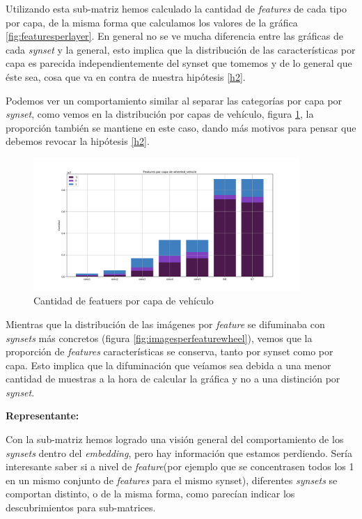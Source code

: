 \documentclass[12,twoside]{TFG-GM}
\theoremstyle{definition}
\theoremstyle{remark}
\begin{document}
Utilizando esta sub-matriz hemos calculado la cantidad de \textit{features} de cada tipo por capa, de la misma forma que calculamos los valores de la gráfica \ref{fig:featuresperlayer}. En general no se ve mucha diferencia entre las gráficas de cada \textit{synset} y la general, esto implica que la distribución de las características por capa es parecida independientemente del synset que tomemos y de lo general que éste sea, cosa que va en contra de nuestra hipótesis \ref{h2}.

Podemos ver un comportamiento similar al separar las categorías por capa por \textit{synset}, como vemos en la distribución por capas de vehículo, figura \ref{fig:featuresperlayervehicle}, 
la proporción también se mantiene en este caso, dando más motivos para pensar que debemos revocar la hipótesis \ref{h2}. 

\begin{figure}[ht] 
	\centering
	\includegraphics[width=0.9\textwidth] {Images/plots/25/synsetslayer/Comparative_of_synsets_wheeled_vehicle_global.png}
	\caption{ Cantidad de featuers por capa de vehículo
	\label{fig:featuresperlayervehicle}}
\end{figure}

Mientras que la distribución de las imágenes por \textit{feature} se difuminaba con \textit{synsets} más concretos (figura \ref{fig:imagesperfeaturewheel}), vemos que la proporción de \textit{features} características se conserva, tanto por synset como por capa. Esto implica que la difuminación que veíamos sea debida a una menor cantidad de muestras a la hora de calcular la gráfica y no a una distinción por \textit{synset}. 

\textbf{Representante:}

Con la sub-matriz hemos logrado una visión general del comportamiento de los \textit{synsets} dentro del \textit{embedding}, pero hay información que estamos perdiendo. Sería interesante saber si a nivel de \textit{feature}(por ejemplo que se concentrasen todos los 1 en un mismo conjunto de \textit{features} para el mismo synset), diferentes \textit{synsets} se comportan distinto, o de la misma forma, como parecían indicar los descubrimientos para sub-matrices. 
\end{document}
